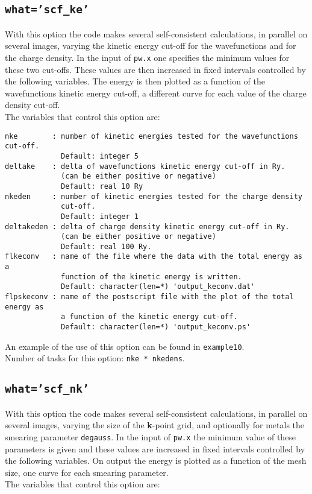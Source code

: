 \documentclass[12pt,a4paper]{article}
\begin{document}
\subsection{\color{web-blue}\texttt{what='scf\_ke'}}
With this option the code makes several self-consistent calculations, 
in parallel on several images, varying the kinetic energy cut-off for 
the wavefunctions and for the charge density. 
In the input of \texttt{pw.x} one specifies the minimum values for these two 
cut-offs. These values are then increased in fixed intervals controlled by the 
following variables. The energy is then plotted as a function of the 
wavefunctions kinetic energy cut-off, a different curve for each value of 
the charge density cut-off. \\
The variables that control this option are:

\begin{verbatim}
nke        : number of kinetic energies tested for the wavefunctions cut-off.
             Default: integer 5
deltake    : delta of wavefunctions kinetic energy cut-off in Ry.
             (can be either positive or negative)
             Default: real 10 Ry
nkeden     : number of kinetic energies tested for the charge density
             cut-off.
             Default: integer 1
deltakeden : delta of charge density kinetic energy cut-off in Ry.
             (can be either positive or negative)
             Default: real 100 Ry.
flkeconv   : name of the file where the data with the total energy as a
             function of the kinetic energy is written.
             Default: character(len=*) 'output_keconv.dat'
flpskeconv : name of the postscript file with the plot of the total energy as
             a function of the kinetic energy cut-off.
             Default: character(len=*) 'output_keconv.ps'
\end{verbatim}
An example of the use of this option can be found in \texttt{example10}. \\
Number of tasks for this option: \texttt{nke * nkedens}.

\subsection{\color{web-blue}\texttt{what='scf\_nk'}}
With this option the code makes several self-consistent calculations, 
in parallel on several images, varying the size of the {\bf k}-point grid, 
and optionally for metals the smearing parameter \texttt{degauss}. In the 
input of \texttt{pw.x} the minimum value of these parameters is given and 
these values are increased in fixed intervals controlled by the following 
variables. On output the energy is plotted as a function of the mesh size, 
one curve for each smearing parameter.\\
The variables that control this option are:
\end{document}
